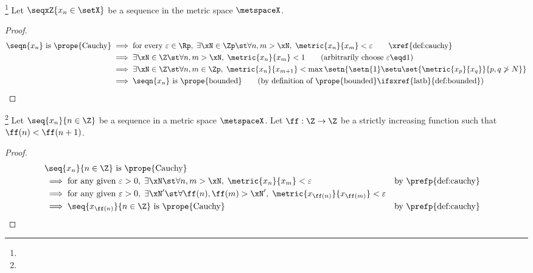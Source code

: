 \begin{lemma}
\label{lem:cauchy==>bounded}
\footnote{
  }
Let $\seqxZ{x_n\in\setX}$ be a sequence in the metric space $\metspaceX$.
\end{lemma}
\begin{proof}
\begin{align*}
  \text{$\seqn{x_n}$ is \prope{Cauchy}}
    &\implies \text{for every $\varepsilon\in\Rp$},\; \exists\xN\in\Zp \st \forall n,m>\xN,\; \metric{x_n}{x_m}<\varepsilon
    \qquad \text{\xref{def:cauchy}}
  \\&\implies \exists\xN\in\Z \st \forall n,m>\xN,\; \metric{x_n}{x_m}<1
    \qquad \text{(arbitrarily choose $\varepsilon\eqd1$)}
  \\&\implies \exists\xN\in\Z \st \forall n,m\in\Zp,\; \metric{x_n}{x_{m+1}}<\max\setn{\setn{1}\setu\set{\metric{x_p}{x_q}}{p,q\ngtr N}}
  \\&\implies \text{$\seqn{x_n}$ is \prope{bounded}}
    \qquad \text{(by definition of \prope{bounded}\ifsxref{latb}{def:bounded})}
\end{align*}
\end{proof}





\begin{proposition}
\footnote{
  }
Let $\seq{x_n}{n\in\Z}$ be a sequence in a metric space $\metspaceX$.
Let $\ff:\Z\to\Z$ be a strictly increasing function such that $\ff(n)<\ff(n+1)$.
\end{proposition}
\begin{proof}
\begin{align*}
  &\text{$\seq{x_n}{n\in\Z}$ is \prope{Cauchy}}
  \\&\implies \text{for any given } \varepsilon>0,\; \exists\xN \st \forall n,m>\xN,\; \metric{x_n}{x_m}<\varepsilon
    &&        \text{by \prefp{def:cauchy}}
  \\&\implies \text{for any given } \varepsilon>0,\; \exists\xN' \st \forall \ff(n),\ff(m)>\xN',\; \metric{x_{\ff(n)}}{x_{\ff(m)}}<\varepsilon
  \\&\implies \seq{x_{\ff(n)}}{n\in\Z} \text{ is \prope{Cauchy}}
    &&        \text{by \prefp{def:cauchy}}
\end{align*}
\end{proof}




